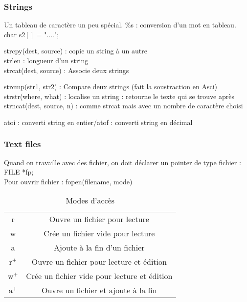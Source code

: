 \documentclass[../main.tex]{subfiles}
\begin{document}
\subsubsection{Strings}
Un tableau de caractère un peu spécial. \%s : conversion d'un mot en tableau.\\
char s2$[]$ = "....";\\
\begin{minipage}{.5\textwidth}
    strcpy(dest, source) : copie un string à un autre\\
    strlen : longueur d'un string\\
    strcat(dest, source) : Associe deux strings\\

\end{minipage}
\hfill
\begin{minipage}{.5\textwidth}
    strcmp(str1, str2) : Compare deux strings (fait la soustraction en Asci)\\ 
    strstr(where, what) : localise un string : retourne le texte qui se trouve après\\
    strncat(dest, source, n) : comme strcat mais avec un nombre de caractère choisi\\
\end{minipage}
atoi : converti string en entier/atof : converti string en décimal\\

\subsubsection{Text files}
Quand on travaille avec des fichier, on doit déclarer un pointer de type fichier :\\
FILE *fp;\\
Pour ouvrir fichier : fopen(filename, mode)\\

 \begin{table}[hbt!]
     \centering
     \begin{tabular}{c|c}
         r & Ouvre un fichier pour lecture \\
         w & Crée un fichier vide pour lecture\\
         a & Ajoute à la fin d'un fichier\\
         r$^+$ & Ouvre un fichier pour lecture et édition\\
         w$^+$ & Crée un fichier vide pour lecture et édition\\
         a$^+$ & Ouvre un fichier et ajoute à la fin\\
     \end{tabular}
     \caption{Modes d'accès}
     
 \end{table}
\end{document}
